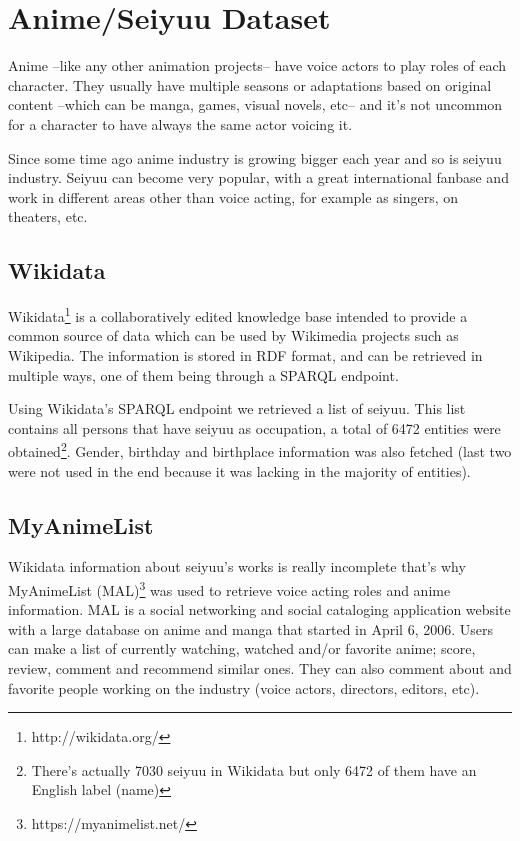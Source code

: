 \chapter{Anime/Seiyuu Dataset}

Anime \---like any other animation projects\--- have voice actors to play roles of each character. They usually have multiple seasons or adaptations based on original content \---which can be manga, games, visual novels, etc\--- and it's not uncommon for a character to have always the same actor voicing it. 

Since some time ago anime industry is growing bigger each year and so is seiyuu industry. Seiyuu can become very popular, with a great international fanbase and work in different areas other than voice acting, for example as singers, on theaters, etc.

\section{Wikidata}
Wikidata\footnote{http://wikidata.org/} is a collaboratively edited knowledge base intended to provide a common source of data which can be used by Wikimedia projects such as Wikipedia. The information is stored in RDF format, and can be retrieved in multiple ways, one of them being through a SPARQL endpoint.

Using Wikidata's SPARQL endpoint we retrieved a list of seiyuu. This list contains all persons that have seiyuu as occupation, a total of 6472 entities were obtained\footnote{There's actually 7030 seiyuu in Wikidata but only 6472 of them have an English label (name)}. Gender, birthday and birthplace information was also fetched (last two were not used in the end because it was lacking in the majority of entities).

\section{MyAnimeList}
Wikidata information about seiyuu's works is really incomplete that's why MyAnimeList (MAL)\footnote{https://myanimelist.net/} was used to retrieve voice acting roles and anime information. MAL is a social networking and social cataloging application website with a large database on anime and manga that started in April 6, 2006. Users can make a list of currently watching, watched and/or favorite anime; score, review, comment and recommend similar ones. They can also comment about and favorite people working on the industry (voice actors, directors, editors, etc).

